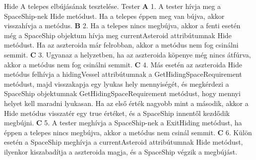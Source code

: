 \documentclass[../../projlab]{subfiles}
\begin{document}
\begin{use-case}
    {Hide}
    {A telepes elbújásának tesztelése.}
    {Tester} 
    \textbf{A} 1.	A tester hívja meg a SpaceShip-nek Hide metódust. Ha a telepes éppen meg van bújva, akkor visszahívja a metódus. \newline
    \textbf{B} 2.	Ha a telepes nincs megbújva, akkor a fenti esetén még a SpaceShip objektum hívja meg currentAsteroid attribútumnak Hide metódust. Ha az aszteroida már felrobban, akkor a metódus nem fog csinálni semmit. \newline
    \textbf{C} 3.	Ugyanaz a helyzetben, ha az aszteroida köpenye még nincs átfúrva, akkor a metódus nem fog csinálni semmit. \newline
    \textbf{C} 4.	Más esetén az aszteroida Hide metódus felhívja a hidingVessel attribútumnak a GetHidingSpaceRequirement metódust, majd visszakapja egy lyukas hely mennyiségét, és megkérdezi a SpaceShip objektumnak GetHidingSpaceRequirement metódust, hogy mennyi helyet kell maradni lyukasan. Ha az első érték nagyobb mint a második, akkor a Hide metódus visszatér egy true értéket, és a SpaceShip innentől kezdődik megbújni. \newline
    \textbf{C} 5.	A tester meghívja a SpaceShip-nek a ExitHiding metódust, ha éppen a telepes nincs megbújva, akkor a metódus nem csinál semmit. \newline
    \textbf{C} 6.	Külön esetén a SpaceShip meghívja a currentAsteroid attribútumnak Hide metódust, ilyenkor kiszabadítja a aszteroida magja, és a SpaceShip végzik a megbújást. \newline
\end{use-case}
\end{document}
